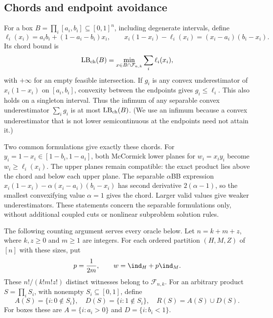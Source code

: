 \subsection{Chords and endpoint avoidance}
For a box $B=\prod_i[a_i,b_i]\subseteq[0,1]^n$, including degenerate
intervals, define
\begin{equation}\label{eq:cardinality-chord}
 \ell_i(x_i)=a_ib_i+(1-a_i-b_i)x_i,\qquad
 x_i(1-x_i)-\ell_i(x_i)=(x_i-a_i)(b_i-x_i).
\end{equation}
Its chord bound is
\[
 \operatorname{LB}_{\rm ch}(B)=
 \min_{x\in B\cap\mathcal F_{n,k}}\sum_i\ell_i(x_i),
\]
with $+\infty$ for an empty feasible intersection. If $g_i$ is any convex
underestimator of $x_i(1-x_i)$ on $[a_i,b_i]$, convexity between the
endpoints gives $g_i\le\ell_i$. This also holds on a singleton interval.
Thus the infimum of any separable convex underestimator $\sum_i g_i$
is at most $\operatorname{LB}_{\rm ch}(B)$. (We use an infimum because a
convex underestimator that is not lower semicontinuous at the endpoints
need not attain it.)

Two common formulations give exactly these chords. For
$y_i=1-x_i\in[1-b_i,1-a_i]$, both McCormick lower planes for
$w_i=x_iy_i$ become $w_i\ge\ell_i(x_i)$. The upper planes remain
compatible: the exact product lies above the chord and below each upper
plane. The separable $\alpha$BB expression
$x_i(1-x_i)-\alpha(x_i-a_i)(b_i-x_i)$ has second derivative
$2(\alpha-1)$, so the smallest convexifying value $\alpha=1$ gives the
chord. Larger valid values give weaker underestimators. These statements
concern the separable formulations only, without additional coupled
cuts or nonlinear subproblem solution rules.

The following counting argument serves every oracle below. Let $n=k+m+z$, where $k,z\ge0$ and $m\ge1$ are integers.
For each ordered partition $(H,M,Z)$ of $[n]$ with these sizes, put
\begin{equation}\label{eq:cardinality-witness}
 p=\frac1{2m},\qquad w=\ind_H+p\ind_M.
\end{equation}
These $n!/(k!m!z!)$ distinct witnesses belong to $\mathcal F_{n,k}$.
For an arbitrary product $S=\prod_i S_i$, with nonempty
$S_i\subseteq[0,1]$, define
\begin{equation}\label{eq:endpoint-exclusions}
 A(S)=\{i:0\notin S_i\},\quad D(S)=\{i:1\notin S_i\},\quad
 R(S)=A(S)\cup D(S).
\end{equation}
For boxes these are $A=\{i:a_i>0\}$ and $D=\{i:b_i<1\}$.

